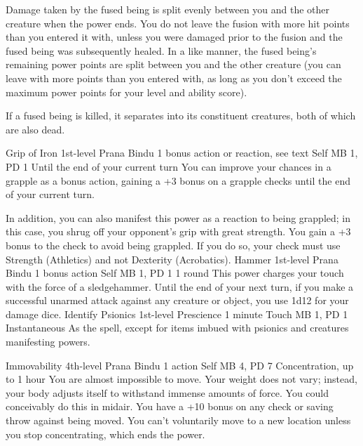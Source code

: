 Damage taken by the fused being is split evenly between you
and the other creature when the power ends. You do not leave
the fusion with more hit points than you entered it with,
unless you were damaged prior to the fusion and the fused
being was subsequently healed. In a like manner, the fused
being's remaining power points are split between you and
the other creature (you can leave with more points than you
entered with, as long as you don't exceed the maximum power
points for your level and ability score).

If a fused being is killed, it separates into its constituent
creatures, both of which are also dead.

\DndPowerHeader%
    {Grip of Iron\label{pwr:grip_of_iron}}
    {1st-level Prana Bindu}
    {1 bonus action or reaction, see text}
    {Self}
    {MB 1, PD 1}
    {Until the end of your current turn}
You can improve your chances in a grapple
as a bonus action, gaining a +3 bonus on a grapple checks
until the end of your current turn.

In addition, you can also manifest this power as a reaction
to being grappled; in this case, you shrug off your opponent's
grip with great strength. You gain a +3 bonus to the check
to avoid being grappled. If you do so, your check must use
Strength (Athletics) and not Dexterity (Acrobatics).
\DndPowerHeader%
    {Hammer\label{pwr:hammer}}
    {1st-level Prana Bindu}
    {1 bonus action}
    {Self}
    {MB 1, PD 1}
    {1 round}
This power charges your touch with the force
of a sledgehammer. Until the end of your next turn, if you
make a successful unarmed attack against any creature or object,
you use 1d12 for your damage dice.
\DndPowerHeader%
    {Identify Psionics\label{pwr:identify_psionics}}
    {1st-level Prescience}
    {1 minute}
    {Touch}
    {MB 1, PD 1}
    {Instantaneous}
As the  spell, except for
items imbued with psionics and creatures manifesting powers.

\DndPowerHeader%
    {Immovability\label{pwr:immovability}}
    {4th-level Prana Bindu}
    {1 action}
    {Self}
    {MB 4, PD 7}
    {Concentration, up to 1 hour}
You are almost impossible to move.
Your weight does not vary;
instead, your body adjusts itself to withstand immense amounts
of force. You could conceivably do this in midair. You have
a +10 bonus on any check or saving throw against being moved.
You can't voluntarily move to a new location unless you stop
concentrating, which ends the power.

